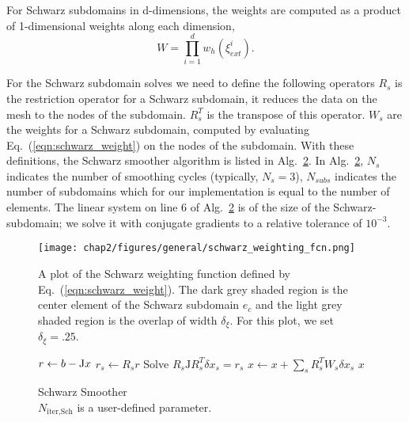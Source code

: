 For Schwarz subdomains in d-dimensions, the weights are computed
as a product of 1-dimensional weights along each dimension,
%
\begin{equation}
  W = \prod_{i=1}^{d} w_h(\xi^i_{ext}).
\end{equation}

%
For the Schwarz subdomain solves we
need to define the following operators\harald{\sout{,}:} $R_s$ is the restriction
operator for a Schwarz subdomain, it reduces the data on the mesh to
the nodes of the subdomain. $R_s^T$ is the transpose of this
operator. $W_s$ are the weights for a Schwarz subdomain, computed by
evaluating Eq.~(\ref{eqn:schwarz_weight}) on the nodes of the
subdomain. With these definitions, the Schwarz smoother algorithm is
listed in Alg.~\ref{alg:schwarz_smoother}. In
Alg.~\ref{alg:schwarz_smoother}, $N_s$ indicates the number of
smoothing cycles (typically, $N_s=3$), $N_{subs}$ indicates the number of subdomains which for our implementation is equal to the number of elements. The linear
system on line 6 of Alg.~\ref{alg:schwarz_smoother} is of the size of the Schwarz-subdomain; we solve it with conjugate gradients to a relative tolerance of $10^{-3}$.

\begin{figure}
  \texttt{[image: chap2/figures/general/schwarz\_weighting\_fcn.png]}
\caption{
  \label{fig:schwarz_weight}
  A plot of the Schwarz weighting function defined by Eq.~(\ref{eqn:schwarz_weight}). The dark grey shaded region is the center element of the Schwarz subdomain  $e_c$  and the light grey shaded region is the overlap of width $\delta_\xi$. For this plot, we set $\delta_\xi = .25$.
}
\end{figure}
%
\begin{figure}
  \begin{algorithm}[H]
    \caption{\label{alg:schwarz_smoother}
      Schwarz Smoother\\ $N_{\text{iter,Sch}}$ is a user-defined parameter.
    }
    \begin{algorithmic}[1]
      \State $r \leftarrow b - {\rm J}x$  %
      \State $r_s \leftarrow R_s r$
      \State Solve $R_s \mathrm{J} R^T_s \delta x_s = r_s$
      \EndFor
      \State $x \leftarrow x + \sum_{s}R_s^TW_s\delta x_s$
      \EndFor
      \State \Return $x$
      \EndFunction
    \end{algorithmic}
  \end{algorithm}
\end{figure}
%
%
